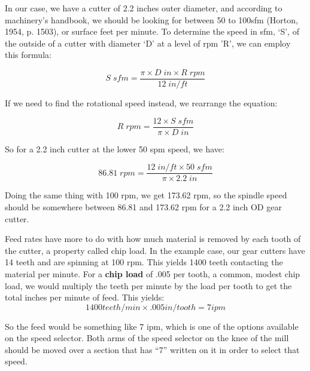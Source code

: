 \documentclass[12pt,twoside,letterpaper]{article}
\begin{document}
In our case, we have a cutter of 2.2 inches outer diameter, and according to machinery's handbook, we should be looking for between 50 to 100sfm (Horton, 1954, p. 1503), or surface feet per minute. To determine the speed in sfm, `S', of the outside of a cutter with diameter `D' at a level of rpm 'R', we can employ this formula:


	\[S \;sfm = \frac{\pi \times D \; in \times R \;rpm}{12 \; in/ft}\]

If we need to find the rotational speed instead, we rearrange the equation:

	\[R\; rpm= \frac{12 \times S \;sfm}{\pi \times D \;in}\]

So for a 2.2 inch cutter at the lower 50 spm speed, we have:

	\[86.81 \; rpm = \frac{12\;  in/ft \times 50\;  sfm }{\pi \times 2.2\;  in} \]

Doing the same thing with 100 rpm, we get 173.62 rpm, so the spindle speed should be somewhere between 86.81 and 173.62 rpm for a 2.2 inch OD gear cutter. 

Feed rates have more to do with how much material is removed by each tooth of the cutter, a property called chip load. In the example case, our gear cutters have 14 teeth and are spinning at 100 rpm. This yields 1400 teeth contacting the material per minute. For a \textbf{chip load} of .005 per tooth, a common, modest chip load, we would multiply the teeth per minute by the load per tooth to get the total inches per minute of feed. This yields:
\[ 1400 teeth/min \times .005 in/tooth = 7 ipm \]

So the feed would be something like 7 ipm, which is one of the options available on the speed selector. Both arms of the speed selector on the knee of the mill should be moved over a section that has ``7'' written on it in order to select that speed.
\end{document}
